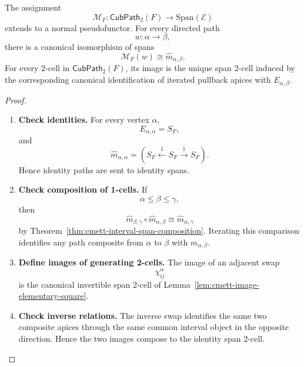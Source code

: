 \begin{theorem}
\label{thm:cmett-directed-cubical-execution-representation}
    The assignment
    \[
        \mathcal M_F:\mathsf{CubPath}_2(F)\to\mathrm{Span}(\mathcal E)
    \]
    extends to a normal pseudofunctor. For every directed path
    \[
        w:\alpha\to\beta,
    \]
    there is a canonical isomorphism of spans
    \[
        \mathcal M_F(w)\cong\widehat m_{\alpha,\beta}.
    \]
    For every 2-cell in \(\mathsf{CubPath}_2(F)\), its image is the unique
    span 2-cell induced by the corresponding canonical identification of
    iterated pullback apices with \(E_{\alpha,\beta}\).
\end{theorem}

\begin{proof}
    \leavevmode
    \begin{enumerate}
        \item \textbf{Check identities.}
        For every vertex \(\alpha\),
        \[
            E_{\alpha,\alpha}=S_F,
        \]
        and
        \[
            \widehat m_{\alpha,\alpha}
            =
            \left(
                S_F\xleftarrow{1}S_F\xrightarrow{1}S_F
            \right).
        \]
        Hence identity paths are sent to identity spans.

        \item \textbf{Check composition of 1-cells.}
        If
        \[
            \alpha\leq\beta\leq\gamma,
        \]
        then
        \[
            \widehat m_{\beta,\gamma}\circ\widehat m_{\alpha,\beta}
            \cong
            \widehat m_{\alpha,\gamma}
        \]
        by Theorem~\ref{thm:cmett-interval-span-composition}. Iterating this
        comparison identifies any path composite from \(\alpha\) to \(\beta\)
        with \(\widehat m_{\alpha,\beta}\).

        \item \textbf{Define images of generating 2-cells.}
        The image of an adjacent swap
        \[
            \chi_{ij}^{\alpha}
        \]
        is the canonical invertible span 2-cell of
        Lemma~\ref{lem:cmett-image-elementary-square}.

        \item \textbf{Check inverse relations.}
        The inverse swap identifies the same two composite apices through the
        same common interval object in the opposite direction. Hence the two
        images compose to the identity span 2-cell.


\end{enumerate}
\end{proof}
